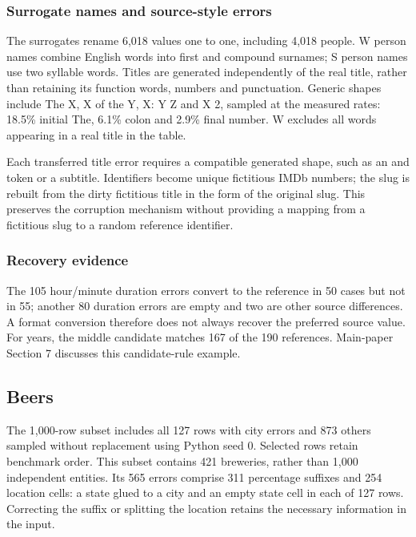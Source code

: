 \documentclass[10pt,a4paper]{article}
\begin{document}
\subsubsection{Surrogate names and source-style errors}

The surrogates rename 6,018 values one to one, including 4,018 people. W person names combine English words into first and compound surnames; S person names use two syllable words. Titles are generated independently of the real title, rather than retaining its function words, numbers and punctuation. Generic shapes include {\ttfamily\small The X}, {\ttfamily\small X of the Y}, {\ttfamily\small X: Y Z} and {\ttfamily\small X 2}, sampled at the measured rates: 18.5\% initial {\ttfamily\small The}, 6.1\% colon and 2.9\% final number. W excludes all words appearing in a real title in the table.

Each transferred title error requires a compatible generated shape, such as an {\ttfamily\small and} token or a subtitle. Identifiers become unique fictitious IMDb numbers; the slug is rebuilt from the dirty fictitious title in the form of the original slug. This preserves the corruption mechanism without providing a mapping from a fictitious slug to a random reference identifier.

\subsubsection{Recovery evidence}

The 105 hour/minute duration errors convert to the reference in 50 cases but not in 55; another 80 duration errors are empty and two are other source differences. A format conversion therefore does not always recover the preferred source value. For years, the middle candidate matches 167 of the 190 references. Main-paper Section 7 discusses this candidate-rule example.

\subsection{Beers}

The 1,000-row subset includes all 127 rows with city errors and 873 others sampled without replacement using Python seed 0. Selected rows retain benchmark order. This subset contains 421 breweries, rather than 1,000 independent entities. Its 565 errors comprise 311 percentage suffixes and 254 location cells: a state glued to a city and an empty state cell in each of 127 rows. Correcting the suffix or splitting the location retains the necessary information in the input.
\end{document}
